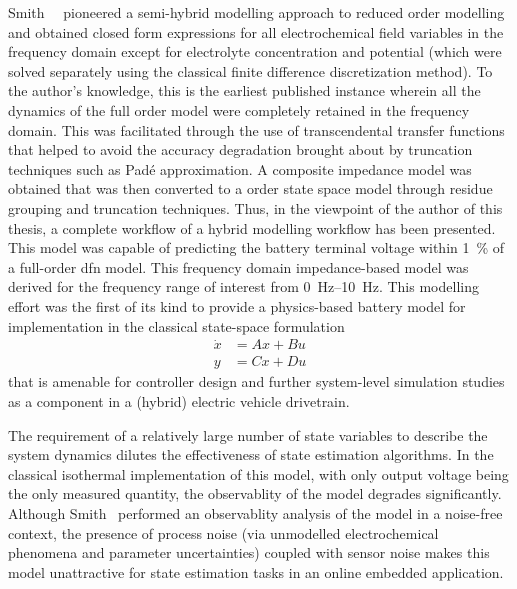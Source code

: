 Smith~\etal{}~\cite{Smith2007}  pioneered   a  semi-hybrid   modelling  approach
to  reduced  order  modelling  and  obtained closed  form  expressions  for  all
electrochemical field variables  in the frequency domain  except for electrolyte
concentration and  potential (which were  solved separately using  the classical
finite difference discretization method). To the author's knowledge, this is the
earliest  published  instance  wherein  all  the  dynamics  of  the  full  order
model were  completely retained  in the frequency  domain. This  was facilitated
through the  use of transcendental transfer  functions that helped to  avoid the
accuracy  degradation  brought about  by  truncation  techniques such  as  Padé
approximation. A composite impedance model  was obtained that was then converted
to  a   order state  space model  through residue  grouping and
truncation techniques.  Thus, in the viewpoint  of the author of  this thesis, a
complete workflow of a hybrid modelling  workflow has been presented. This model
was capable of  predicting the battery terminal  voltage within \SI{1}{\percent}
of a full-order \gls{dfn} model. This frequency domain impedance-based model was
derived for the  frequency range of interest  from \SIrange{0}{10}{\hertz}. This
modelling effort  was the first of  its kind to provide  a physics-based battery
model for implementation in the classical state-space formulation
\begin{equation}\label{eq:statespace}
    \begin{aligned}
        \dot{x} &= Ax + Bu \\
        y &= Cx + Du
    \end{aligned}
\end{equation}
that  is amenable  for  controller design  and  further system-level  simulation
studies \eg{} as a component in a (hybrid) electric vehicle drivetrain.


The requirement of a relatively large  number of state variables to describe the
system dynamics dilutes the effectiveness of state estimation algorithms. In the
classical  isothermal implementation  of this  model, with  only output  voltage
being  the  only measured  quantity,  the  observablity  of the  model  degrades
significantly. Although Smith~\etal{} performed  an observablity analysis of the
model in  a noise-free context,  the presence  of process noise  (via unmodelled
electrochemical phenomena and parameter uncertainties) coupled with sensor noise
makes this model  unattractive for state estimation tasks in  an online embedded
application.


